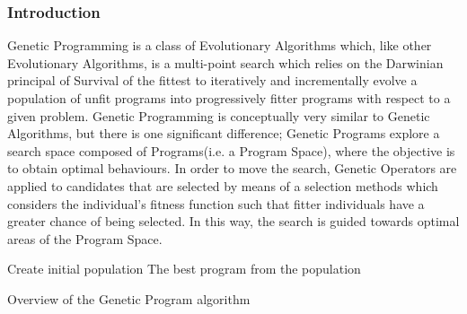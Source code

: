 \documentclass[a4paper,12pt]{article}
\begin{document}
        \subsubsection{Introduction}
            \par{
                Genetic Programming is a class of Evolutionary Algorithms which, like
                other Evolutionary Algorithms, is a multi-point search which relies on the Darwinian
                principal of Survival of the fittest to iteratively and incrementally evolve
                a population of unfit programs into progressively fitter programs with respect
                to a given problem.\newline 
                \newline
                Genetic Programming is conceptually very similar to Genetic Algorithms, but
                there is one significant difference; Genetic Programs explore a search space
                composed of Programs(i.e. a Program Space), where the objective is to obtain
                optimal behaviours.\newline 
                \newline
                In order to move the search, Genetic Operators are applied to candidates that
                are selected by means of a selection methods which considers the individual’s
                fitness function such that fitter individuals have a greater chance of being selected. 
                In this way, the search is guided towards optimal areas of the Program
                Space.\newline
                \newline 
                \begin{algorithm}[H]
                    \SetAlgoLined
                    Create initial population\;
                    \Return The best program from the population 
                    \caption{Overview of the Genetic Program algorithm}
                    \label{alg:gp}
                \end{algorithm} 
            }
        
\end{document}
